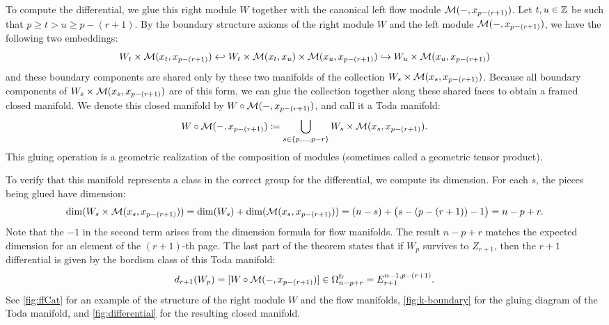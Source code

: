 To compute the differential, we glue this right module $W$ together with the canonical left flow module $\mathcal{M}(-,x_{p-(r+1)})$.
Let $t,u \in \mathbb{Z}$ be such that $p \geq t > u \geq p-(r+1)$. By the boundary structure axioms of the right module $W$ and the left module $\mathcal{M}(-,x_{p-(r+1)})$, we have the following two embeddings:
\begin{equation*}
    W_t \times \mathcal{M}(x_t,x_{p-(r+1)}) \hookleftarrow W_t \times \mathcal{M}(x_t,x_u) \times \mathcal{M}(x_u,x_{p-(r+1)}) \hookrightarrow W_u \times \mathcal{M}(x_u,x_{p-(r+1)})
\end{equation*}
and these boundary components are shared only by these two manifolds of the collection $W_s \times \mathcal{M}(x_s,x_{p-(r+1)})$.
Because all boundary components of $W_s \times \mathcal{M}(x_s,x_{p-(r+1)})$ are of this form, we can glue the collection together along these shared faces to obtain a framed closed manifold. We denote this closed manifold by $W \circ \mathcal{M}(-,x_{p-(r+1)})$, and call it a Toda manifold:
\begin{equation*}
    W \circ \mathcal{M}(-,x_{p-(r+1)}) \coloneqq \bigcup_{s \in \{p,\dots, p-r\}} W_s \times \mathcal{M}(x_s,x_{p-(r+1)}).
\end{equation*}
This gluing operation is a geometric realization of the composition of modules (sometimes called a geometric tensor product).

To verify that this manifold represents a class in the correct group for the differential, we compute its dimension. For each $s$, the pieces being glued have dimension: 
\begin{equation*}
    \dim(W_s \times \mathcal{M}(x_s,x_{p-(r+1)})) = \dim(W_s) + \dim(\mathcal{M}(x_s,x_{p-(r+1)})) = (n-s) + \big(s - (p-(r+1)) - 1 \big) = n-p+r.
\end{equation*}
Note that the $-1$ in the second term arises from the dimension formula for flow manifolds. The result $n-p+r$ matches the expected dimension for an element of the $(r+1)$-th page.
The last part of the theorem states that if $W_p$ survives to $Z_{r+1}$, then the $r+1$ differential is given by the bordism class of this Toda manifold: 
\begin{equation*}
    d_{r+1}(W_p) = [W \circ \mathcal{M}(-,x_{p-(r+1)})] \in \Omega^{\operatorname{fr}}_{n-p+r} = E_{r+1}^{n-1,p-(r+1)}.
\end{equation*}
See \cref{fig:ffCat} for an example of the structure of the right module $W$ and the flow manifolds,
\cref{fig:k-boundary} for the gluing diagram of the Toda manifold, and \cref{fig:differential} for the resulting closed manifold.
